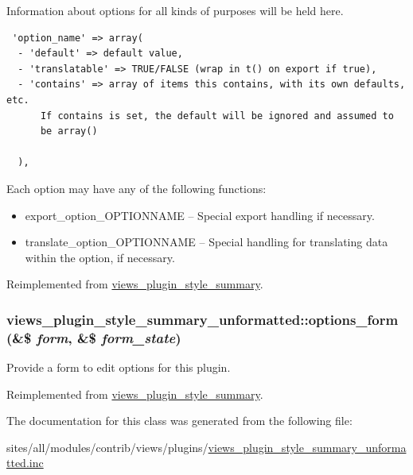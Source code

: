 Information about options for all kinds of purposes will be held here. 

\begin{Code}\begin{verbatim} 'option_name' => array(
  - 'default' => default value,
  - 'translatable' => TRUE/FALSE (wrap in t() on export if true),
  - 'contains' => array of items this contains, with its own defaults, etc.
      If contains is set, the default will be ignored and assumed to
      be array()

  ),
\end{verbatim}
\end{Code}

 Each option may have any of the following functions:\begin{itemize}
\item export\_\-option\_\-OPTIONNAME -- Special export handling if necessary.\item translate\_\-option\_\-OPTIONNAME -- Special handling for translating data within the option, if necessary. \end{itemize}


Reimplemented from \hyperlink{classviews__plugin__style__summary_7b016dd1af2076e3cf3199cede83d953}{views\_\-plugin\_\-style\_\-summary}.\hypertarget{classviews__plugin__style__summary__unformatted_8770285dac047bf88a2c77b2e798826d}{
\subsubsection[{options\_\-form}]{\setlength{\rightskip}{0pt plus 5cm}views\_\-plugin\_\-style\_\-summary\_\-unformatted::options\_\-form (\&\$ {\em form}, \/  \&\$ {\em form\_\-state})}}
\label{classviews__plugin__style__summary__unformatted_8770285dac047bf88a2c77b2e798826d}


Provide a form to edit options for this plugin. 

Reimplemented from \hyperlink{classviews__plugin__style__summary_43826183b4d54242ae5276f40f70475f}{views\_\-plugin\_\-style\_\-summary}.

The documentation for this class was generated from the following file:\begin{CompactItemize}
\item 
sites/all/modules/contrib/views/plugins/\hyperlink{views__plugin__style__summary__unformatted_8inc}{views\_\-plugin\_\-style\_\-summary\_\-unformatted.inc}\end{CompactItemize}
